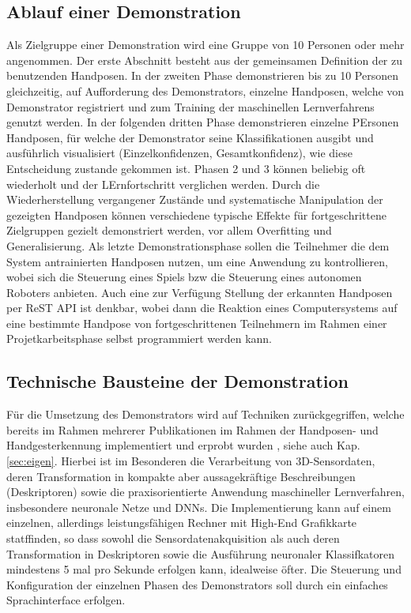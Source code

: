 \documentclass{article}
\begin{document}
\subsection {Ablauf einer Demonstration}
Als Zielgruppe einer Demonstration wird eine Gruppe von 10 Personen oder mehr angenommen. Der erste Abschnitt besteht aus der gemeinsamen Definition der 
zu benutzenden Handposen. In der zweiten Phase demonstrieren bis zu 10 Personen gleichzeitig, auf Aufforderung des Demonstrators, einzelne Handposen, welche von Demonstrator registriert 
und zum Training der maschinellen Lernverfahrens genutzt werden. In der folgenden dritten Phase demonstrieren einzelne PErsonen Handposen, für welche der Demonstrator seine Klassifikationen ausgibt und
ausführlich visualisiert (Einzelkonfidenzen, Gesamtkonfidenz), wie diese Entscheidung zustande gekommen ist. Phasen 2 und 3 können beliebig oft wiederholt und der LErnfortschritt verglichen werden. Durch die Wiederherstellung vergangener Zustände und systematische Manipulation der gezeigten Handposen können verschiedene typische Effekte für fortgeschrittene Zielgruppen gezielt demonstriert werden, vor allem Overfitting und Generalisierung. 
%
Als letzte Demonstrationsphase sollen die Teilnehmer die dem System antrainierten Handposen nutzen, um eine Anwendung zu kontrollieren, wobei sich
die Steuerung eines Spiels bzw die Steuerung eines autonomen Roboters anbieten. Auch eine zur Verfügung Stellung der erkannten Handposen per ReST API ist denkbar, 
wobei dann die Reaktion eines Computersystems auf eine bestimmte Handpose von fortgeschrittenen Teilnehmern im Rahmen einer Projetkarbeitsphase selbst programmiert werden kann.
%
\subsection{Technische Bausteine der Demonstration}
Für die Umsetzung des Demonstrators wird auf Techniken zurückgegriffen, welche bereits im Rahmen mehrerer Publikationen im Rahmen der Handposen- und Handgesterkennung implementiert und erprobt wurden \cite{gr1,gr2,gr3}, siehe auch Kap. \ref{sec:eigen}. Hierbei ist im Besonderen die Verarbeitung von 3D-Sensordaten, deren Transformation in kompakte aber aussagekräftige Beschreibungen (Deskriptoren) sowie die praxisorientierte Anwendung maschineller Lernverfahren, insbesondere neuronale Netze und DNNs. Die Implementierung kann auf einem einzelnen, allerdings leistungsfähigen Rechner mit High-End Grafikkarte statffinden, so dass sowohl die Sensordatenakquisition als auch deren Transformation in Deskriptoren sowie die Ausführung neuronaler Klassifkatoren mindestens 5 mal pro Sekunde erfolgen kann, idealweise öfter. Die Steuerung und Konfiguration der einzelnen Phasen des Demonstrators soll durch ein einfaches Sprachinterface erfolgen.
%
\end{document}
